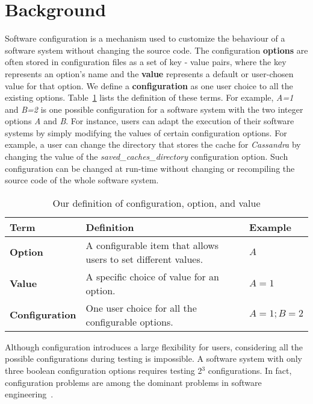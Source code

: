 
\section{Background}
\label{sec:back}



Software configuration is a mechanism used to customize the behaviour of a software system without changing the source code. The configuration \textbf{options} are often stored in configuration files as a set of key - value pairs, where the key represents an option's name and the \textbf{value} represents a default or user-chosen value for that option. We define a \textbf{configuration} as one user choice to all the existing options. Table~\ref{tab:terms} lists the definition of these terms. For example, \emph{A=1} and \emph{B=2} is one possible configuration for a software system with the two integer options \emph{A} and \emph{B}. For instance, users can adapt the execution of their software systems by simply modifying the values of certain configuration options. For example, a user can change the directory that stores the cache for \emph{Cassandra} by changing the value of the \textit{saved\_caches\_directory} configuration option. Such configuration can be changed at run-time without changing or recompiling the source code of the whole software system.

\begin{table}[ht]
    \centering
    \caption{Our definition of configuration, option, and value}
    \begin{tabular}{l|p{6.6cm}|l}
        \hline
        Term & Definition & Example \\
        \hline
        \textbf{Option}  & A configurable item that allows users to set different values. & $A$ \\
        \textbf{Value} & A specific choice of value for an option. & $A = 1$ \\
        \textbf{Configuration} & One user choice for all the configurable options. & $A = 1; B = 2$ \\
        \hline
    \end{tabular}
    \label{tab:terms}
\end{table}


Although configuration introduces a large flexibility for users, considering all the possible configurations during testing is impossible. A software system with only three boolean configuration options requires testing 2${^3}$ configurations. In fact, configuration problems are among the dominant problems in software engineering~\cite{tse,RN2897}.

